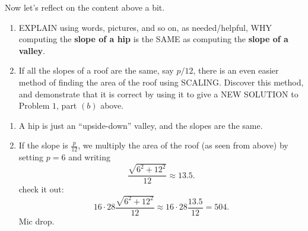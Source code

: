 \documentclass[hints,nooutcomes,noauthor,handout]{ximera}
\begin{document}
\begin{question}
  Now let's reflect on the content above a bit.
  \begin{enumerate}
    \item EXPLAIN using words, pictures, and so on, as needed/helpful,
      WHY computing the \textbf{slope of a hip} is the SAME as computing the
      \textbf{slope of a valley}.
    \item If all the slopes of a roof are the same, say $p/12$, there
      is an even easier method of finding the area of the roof using
      SCALING. Discover this method, and demonstrate that it is
      correct by using it to give a NEW SOLUTION to Problem $1$, part
      $(b)$ above.
  \end{enumerate}
  \begin{freeResponse}
    \begin{enumerate}
  \item A hip is just an ``upside-down'' valley, and the slopes are
    the same.
  \item If the slope is $\frac{p}{12}$, we multiply the area of the
    roof (as seen from above) by setting $p = 6$ and writing
    \[
    \frac{\sqrt{6^2+12^2}}{12} \approx 13.5.
    \]
    check it out:
    \[
    16\cdot 28 \frac{\sqrt{6^2+12^2}}{12} \approx 16\cdot 28 \frac{13.5}{12} = 504.
    \]
    Mic drop.
    \end{enumerate}
  \end{freeResponse}
\end{question}
\end{document}
